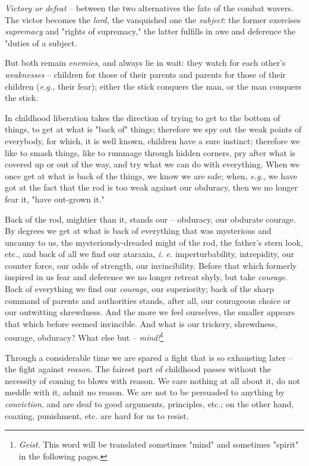 \documentclass[a4paper]{book}
\begin{document}
\textit{Victory or defeat} -- between the two alternatives the fate of the 
combat wavers. The victor becomes the \textit{lord,} the vanquished one the 
\textit{subject}: the former exercises \textit{supremacy} and "{}rights of 
supremacy,"{} the latter fulfills in awe and deference the "{}duties of a 
subject.

But both remain \textit{enemies}, and always lie in wait: they watch for each 
other's \textit{weaknesses} -- children for those of their parents and parents 
for those of their children (\textit{e.g.,} their fear); either the stick 
conquers the man, or the man conquers the stick.

In childhood liberation takes the direction of trying to get to the bottom of 
things, to get at what is "{}back of"{} things; therefore we spy out the weak 
points of everybody, for which, it is well known, children have a sure 
instinct; therefore we like to smash things, like to rummage through hidden 
corners, pry after what is covered up or out of the way, and try what we can 
do with everything. When we once get at what is back of the things, we know we 
are safe; when, \textit{e.g.,} we have got at the fact that the rod is too 
weak against our obduracy, then we no longer fear it, "{}have out-grown it."{}

Back of the rod, mightier than it, stands our -- obduracy, our obdurate 
courage. By degrees we get at what is back of everything that was mysterious 
and uncanny to us, the mysteriously-dreaded might of the rod, the father's 
stern look, etc., and back of all we find our ataraxia, \textit{i. e.} 
imperturbability, intrepidity, our counter force, our odds of strength, our 
invincibility. Before that which formerly inspired in us fear and deference we 
no longer retreat shyly, but take \textit{courage}. Back of everything we find 
our \textit{courage}, our superiority; back of the sharp command of parents 
and authorities stands, after all, our courageous choice or our outwitting 
shrewdness. And the more we feel ourselves, the smaller appears that which 
before seemed invincible. And what is our trickery, shrewdness, courage, 
obduracy? What else but -- \textit{mind!}\footnote{\textit{Geist}. This word 
will be translated sometimes "{}mind"{} and sometimes "{}spirit"{} in the 
following pages.}

Through a considerable time we are spared a fight that is so exhausting later 
-- the fight against \textit{reason.} The fairest part of childhood passes 
without the necessity of coming to blows with reason. We care nothing at all 
about it, do not meddle with it, admit no reason. We are not to be persuaded 
to anything by \textit{conviction}, and are deaf to good arguments, 
principles, etc.; on the other hand, coaxing, punishment, etc. are hard for us 
to resist.
\end{document}
